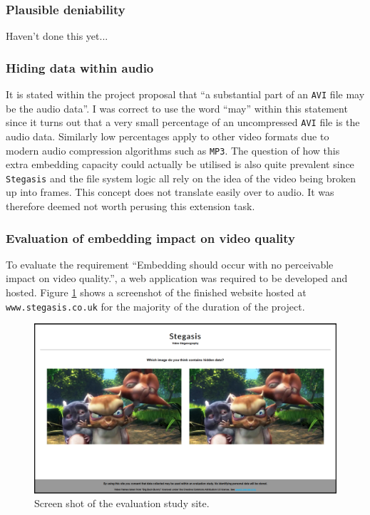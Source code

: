 \documentclass[paper=a4, fontsize=11pt,twoside]{scrartcl}    %
\numberwithin{table}{section}
\numberwithin{figure}{section}
\numberwithin{algorithm}{section}
\begin{document}

\subsubsection{Plausible deniability}

Haven't done this yet...

\subsubsection{Hiding data within audio}

It is stated within the project proposal that ``a substantial part of an \texttt{AVI} file may be the audio data''. I was correct to use the word ``may'' within this statement since it turns out that a very small percentage of an uncompressed \texttt{AVI} file is the audio data. Similarly low percentages apply to other video formats due to modern audio compression algorithms such as \texttt{MP3}. The question of how this extra embedding capacity could actually be utilised is also quite prevalent since \texttt{Stegasis} and the file system logic all rely on the idea of the video being broken up into frames. This concept does not translate easily over to audio. It was therefore deemed not worth perusing this extension task. 

\subsubsection{Evaluation of embedding impact on video quality}

To evaluate the requirement ``Embedding should occur with no perceivable impact on video quality.'', a web application was required to be developed and hosted. Figure \ref{site} shows a screenshot of the finished website hosted at \texttt{www.stegasis.co.uk} for the majority of the duration of the project.

\begin{figure}[!h]
\centerline{\includegraphics[width=\textwidth]{images/site.png}}
\caption{Screen shot of the evaluation study site.}
\label{site}
\end{figure}
\end{document}
